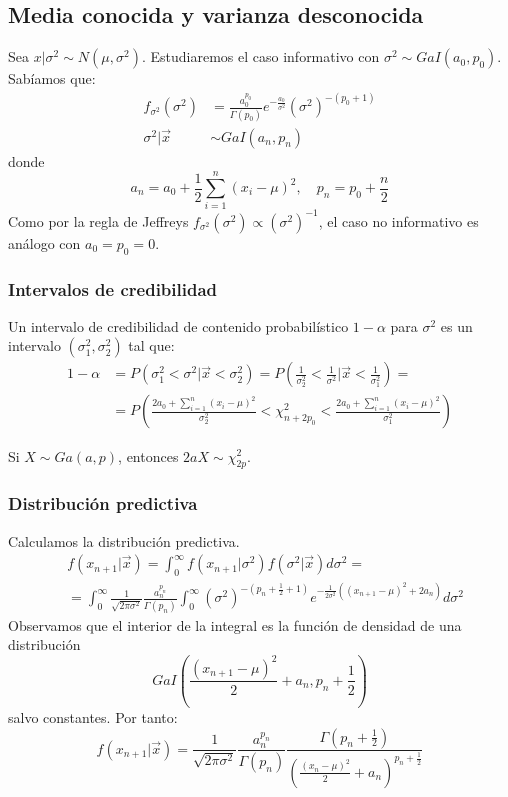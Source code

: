 \subsection*{Media conocida y varianza desconocida}
Sea $x|\sigma^2 \sim N(\mu, \sigma^2)$.
Estudiaremos el caso informativo con $\sigma^2 \sim GaI(a_0, p_0)$.
Sabíamos que:
\begin{align*}
    f_{\sigma^2}(\sigma^2) & = \frac{a_0^{p_0}}{\Gamma(p_0)}e^{-\frac{a_0}{\sigma^2}}(\sigma^2)^{-(p_0+1)} \\
    \sigma^2|\vec{x}       & \sim GaI(a_n, p_n)
\end{align*}
donde
$$a_n = a_0 + \frac{1}{2}\sum_{i=1}^n(x_i-\mu)^2, \quad p_n = p_0 + \frac{n}{2}$$
Como por la regla de Jeffreys $f_{\sigma^2}(\sigma^2) \propto (\sigma^2)^{-1}$, el caso no informativo es análogo con $a_0 = p_0 = 0$.

\subsubsection*{Intervalos de credibilidad}
Un intervalo de credibilidad de contenido probabilístico $1-\alpha$ para $\sigma^2$ es un intervalo $(\sigma^2_1, \sigma^2_2)$ tal que:
\begin{align*}
    1-\alpha & = P(\sigma^2_1 < \sigma^2|\vec{x} < \sigma^2_2) = P(\frac{1}{\sigma^2_2} < \frac{1}{\sigma^2}|\vec{x} < \frac{1}{\sigma^2_1}) =           \\
             & = P\left(\frac{2a_0 + \sum_{i=1}^n (x_i-\mu)^2}{\sigma^2_2} < \chi^2_{n+2p_0} < \frac{2a_0 + \sum_{i=1}^n (x_i-\mu)^2}{\sigma^2_1}\right)
\end{align*}

\begin{note}
    Si $X \sim Ga(a, p)$, entonces $2aX \sim \chi^2_{2p}$.
\end{note}

\subsubsection*{Distribución predictiva}
Calculamos la distribución predictiva.
\begin{align*}
     & f(x_{n+1}|\vec{x}) = \int_0^\infty f(x_{n+1}|\sigma^2)f(\sigma^2|\vec{x})d\sigma^2 =                                                                                                 \\
     & = \int_0^\infty \frac{1}{\sqrt{2\pi\sigma^2}}\frac{a_n^{p_n}}{\Gamma(p_n)} \int_0^\infty (\sigma^2)^{-(p_n+\frac{1}{2}+1)} e^{-\frac{1}{2\sigma^2}((x_{n+1}-\mu)^2 + 2a_n)}d\sigma^2
\end{align*}
Observamos que el interior de la integral es la función de densidad de una distribución
$$GaI\left(\frac{(x_{n+1}-\mu)^2}{2} + a_n, p_n + \frac{1}{2}\right)$$
salvo constantes.
Por tanto:
$$f(x_{n+1}|\vec{x}) = \frac{1}{\sqrt{2\pi\sigma^2}}\frac{a_n^{p_n}}{\Gamma(p_n)} \frac{\Gamma\left(p_n+\frac{1}{2}\right)}{\left(\frac{(x_n-\mu)^2}{2}+a_n\right)^{p_n+\frac{1}{2}}}$$

